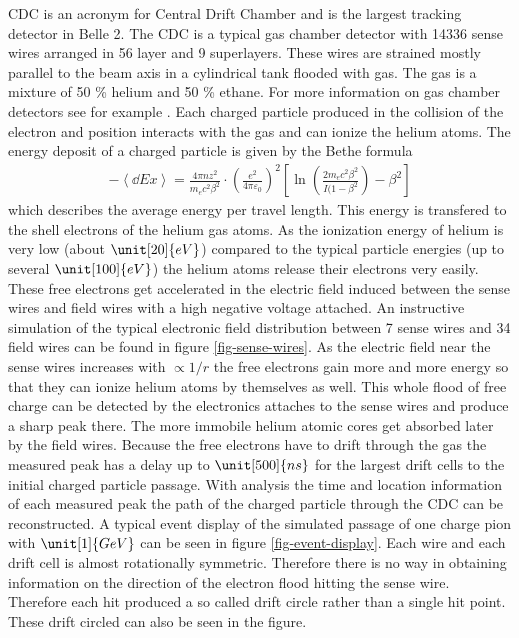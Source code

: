 CDC is an acronym for Central Drift Chamber and is the largest tracking detector in Belle 2. The CDC is a typical  gas chamber detector with 14336 sense wires arranged in 56 layer and 9 superlayers. These wires are strained mostly parallel to the beam axis in a cylindrical tank flooded with gas. The gas is a mixture of 50 \% helium and 50 \% ethane. For more information on gas chamber detectors see for example \cite{grupen}.
Each charged particle produced in the collision of the electron and position interacts with the gas and can ionize the helium atoms. The energy deposit of a charged particle is given by the Bethe formula \cite{bethe}
\begin{align}
 - \left\langle \dd{E}{x} \right\rangle = \frac{4 \pi n z^2}{m_e c^2 \beta^2} \cdot \left( \frac{e^2}{4 \pi \varepsilon_0} \right)^2 \left[ \ln\left( \frac{2 m_e c^2 \beta^2}{I(1 - \beta^2} \right) - \beta^2 \right] \label{form-bethe}
\end{align}
which describes the average energy per travel length. This energy is transfered to the shell electrons of the helium gas atoms. As the ionization energy of helium is very low (about $\unit[20]{eV}$) compared to the typical particle energies (up to several $\unit[100]{eV}$) the helium atoms release their electrons very easily. These free electrons get accelerated in the electric field induced between the sense wires and field wires with a high negative voltage attached. An instructive simulation of the typical electronic field distribution between 7 sense wires and 34 field wires can be found in figure \ref{fig-sense-wires}. As the electric field near the sense wires increases with $\propto 1/r$ the free electrons gain more and more energy so that they can ionize helium atoms by themselves as well. This whole flood of free charge can be detected by the electronics attaches to the sense wires and produce a sharp peak there. The more immobile helium atomic cores get absorbed later by the field wires. Because the free electrons have to drift through the gas the measured peak has a delay up to $\unit[500]{ns}$ for the largest drift cells to the initial charged particle passage. With analysis the time and location information of each measured peak the path of the charged particle through the CDC can be reconstructed. A typical event display of the simulated passage of one charge pion with $\unit[1]{GeV}$ can be seen in figure \ref{fig-event-display}. Each wire and each drift cell is almost rotationally symmetric. Therefore there is no way in obtaining information on the direction of the electron flood hitting the sense wire. Therefore each hit produced a so called drift circle rather than a single hit point. These drift circled can also be seen in the figure.

